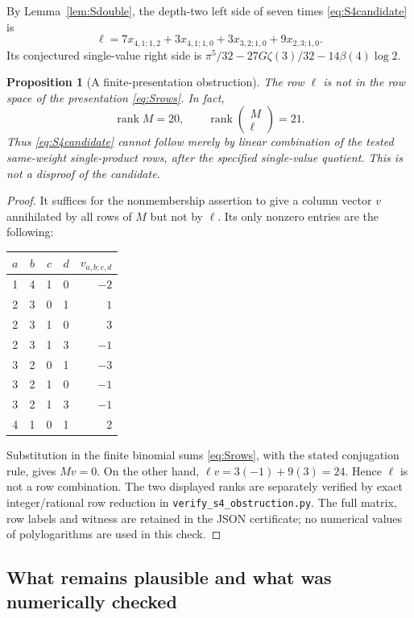 \documentclass[11pt]{article}
\numberwithin{equation}{section}
\newtheorem{proposition}[theorem]{Proposition}
\theoremstyle{definition}\newtheorem{definition}[theorem]{Definition}
\theoremstyle{remark}\newtheorem{remark}[theorem]{Remark}
\DeclareMathOperator{\rank}{rank}
\newcommand{\code}[1]{\texttt{\small #1}}
\begin{document}
By Lemma~\ref{lem:Sdouble}, the depth-two left side of seven times
\eqref{eq:S4candidate} is
\begin{equation}\label{eq:S4target}
\ell=7x_{4,1;1,2}+3x_{4,1;1,0}
+3x_{3,2;1,0}+9x_{2,3;1,0}.
\end{equation}
Its conjectured single-value right side is
$\pi^5/32-27G\zeta(3)/32-14\beta(4)\log2$.

\begin{proposition}[A finite-presentation obstruction]\label{prop:s4obstruction}
The row $\ell$ is not in the row space of the presentation
\eqref{eq:Srows}. In fact,
\[
\rank M=20,\qquad \rank\begin{pmatrix}M\\\ell\end{pmatrix}=21.
\]
Thus \eqref{eq:S4candidate} cannot follow merely by linear combination
of the tested same-weight single-product rows, after the specified
single-value quotient. This is not a disproof of the candidate.
\end{proposition}
\begin{proof}
It suffices for the nonmembership assertion to give a column vector $v$
annihilated by all rows of $M$ but not by $\ell$. Its only nonzero entries
are the following:
\begin{center}
\begin{tabular}{ccccr}
\toprule
$a$&$b$&$c$&$d$&$v_{a,b;c,d}$\\\midrule
1&4&1&0&$-2$\\
2&3&0&1&$1$\\
2&3&1&0&$3$\\
2&3&1&3&$-1$\\
3&2&0&1&$-3$\\
3&2&1&0&$-1$\\
3&2&1&3&$-1$\\
4&1&0&1&$2$\\\bottomrule
\end{tabular}
\end{center}
Substitution in the finite binomial sums \eqref{eq:Srows}, with the stated
conjugation rule, gives $Mv=0$. On the other hand,
$\ell v=3(-1)+9(3)=24$. Hence $\ell$ is not a row combination.
The two displayed ranks are separately verified by exact integer/rational
row reduction in \code{verify\_s4\_obstruction.py}. The full matrix, row
labels and witness are retained in the JSON certificate; no numerical
values of polylogarithms are used in this check.
\end{proof}

\subsection{What remains plausible and what was numerically checked}
\end{document}
